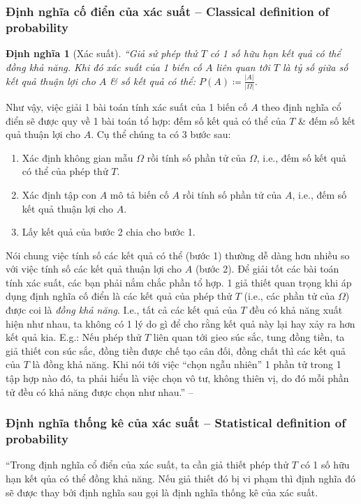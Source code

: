 \documentclass[oneside]{book}
\numberwithin{equation}{section}
\newtheorem{dinhnghia}{Định nghĩa}[section]
\begin{document}
\subsubsection{Định nghĩa cố điển của xác suất -- Classical definition of probability}

\begin{dinhnghia}[Xác suất]
	``Giả sử phép thử $T$ có 1 số hữu hạn kết quả có thể đồng khả năng. Khi đó \emph{xác suất của 1 biến cố  $A$} liên quan tới $T$ là tỷ số giữa số kết quả thuận lợi cho $A$ \& số kết quả có thể: $P(A)\coloneqq\frac{|A|}{|\Omega|}$.
\end{dinhnghia}
Như vậy, việc giải 1 bài toán tính xác suất của 1 biến cố $A$ theo định nghĩa cổ điển sẽ được quy về 1 bài toán tổ hợp: đếm số kết quả có thể của $T$ \& đếm số kết quả thuận lợi cho $A$. Cụ thể chúng ta có 3 bước sau:
\begin{enumerate}
	\item Xác định không gian mẫu $\Omega$ rồi tính số phần tử của $\Omega$, i.e., đếm số kết quả có thể của phép thử $T$.
	\item Xác định tập con $A$ mô tả biến cố $A$ rồi tính số phần tử của $A$, i.e., đếm số kết quả thuận lợi cho $A$.
	\item Lấy kết quả của bước 2 chia cho bước 1.
\end{enumerate}
Nói chung việc tính số các kết quả có thể (bước 1) thường dễ dàng hơn nhiều so với việc tính số các kết quả thuận lợi cho $A$ (bước 2). Để giải tốt các bài toán tính xác suất, các bạn phải nắm chắc phần tổ hợp. 1 giả thiết quan trọng khi áp dụng định nghĩa cố điển là các kết quả của phép thử $T$ (i.e., các phần tử của $\Omega$) được coi là \textit{đồng khả năng}. I.e., tất cả các kết quả của $T$ đều có khả năng xuất hiện như nhau, ta không có 1 lý do gì để cho rằng kết quả này lại hay xảy ra hơn kết quả kia. E.g.: Nếu phép thử $T$ liên quan tới gieo súc sắc, tung đồng tiền, ta giả thiết con súc sắc, đồng tiền được chế tạo cân đối, đồng chất thì các kết quả của $T$ là đồng khả năng. Khi nói tới việc ``chọn ngẫu nhiên'' 1 phần tử trong 1 tập hợp nào đó, ta phải hiểu là việc chọn vô tư, không thiên vị, do đó mỗi phần tử đều có khả năng được chọn như nhau.'' -- \cite[pp. 96--97]{TL_chuyen_Toan_Dai_So_Giai_Tich_11}

\subsubsection{Định nghĩa thống kê của xác suất -- Statistical definition of probability}
``Trong định nghĩa cổ điển của xác suất, ta cần giả thiết phép thử $T$ có 1 số hữu hạn kết qủa có thể đồng khả năng. Nếu giả thiết đó bị vi phạm thì định nghĩa đó sẽ được thay bởi định nghĩa sau gọi là định nghĩa thống kê của xác suất.
\end{document}
